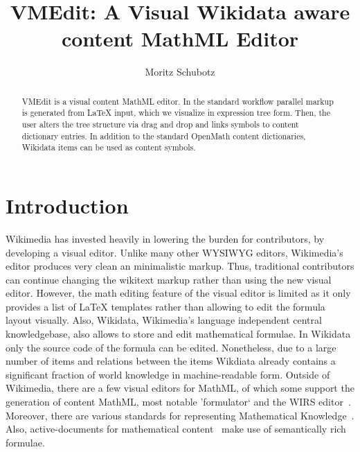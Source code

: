 \documentclass{llncs}
\begin{document}
\title{VMEdit: A Visual Wikidata aware content MathML Editor}

\author{
   Moritz Schubotz
}


\maketitle

\begin{abstract}
VMEdit is a visual content MathML editor.
In the standard workflow parallel markup is generated from LaTeX input, which we visualize in expression tree form.
Then, the user alters the tree structure via drag and drop and links symbols to content dictionary entries.
In addition to the standard OpenMath content dictionaries, Wikidata items can be used as content symbols.
\end{abstract}

\section{Introduction}
Wikimedia has invested heavily in lowering the burden for contributors, by developing a visual editor.
Unlike many other WYSIWYG editors, Wikimedia's editor produces very clean an minimalistic markup.
Thus, traditional contributors can continue changing the wikitext markup rather than using the new visual editor.
However, the math editing feature of the visual editor is limited as it only provides a list of LaTeX templates rather than allowing to edit the formula layout visually.
Also, Wikidata, Wikimedia's language independent central knowledgebase, also allows to store and edit mathematical formulae.
In Wikidata only the source code of the formula can be edited.
Nonetheless, due to a large number of items and relations between the items Wikdiata already contains a significant fraction of world knowledge in machine-readable form.
Outside of Wikimedia, there are a few visual editors for MathML, of which some support the generation of content MathML, most notable 'formulator` and the WIRS editor~\cite{Formulator, Marques2006}.
Moreover, there are various standards for representing Mathematical Knowledge~\cite{Lange2013}.
Also, active-documents for mathematical content~\cite{Kohlhase11} make use of semantically rich formulae.
\end{document}
